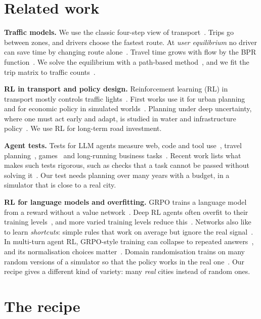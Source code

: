 \documentclass{article}
\begin{document}
\section{Related work}\label{sec:related}

\textbf{Traffic models.} We use the classic four-step view of transport~\cite{ortuzar2011}. Trips go between zones, and drivers choose the fastest route. At \emph{user equilibrium} no driver can save time by changing route alone~\cite{wardrop1952,beckmann1956,sheffi1985}. Travel time grows with flow by the BPR function~\cite{bpr1964}. We solve the equilibrium with a path-based method~\cite{jayakrishnan1994}, and we fit the trip matrix to traffic counts~\cite{vanzuylen1980}.

\textbf{RL in transport and policy design.} Reinforcement learning (RL) in transport mostly controls traffic lights~\cite{wei2018,wei2021}. First works use it for urban planning~\cite{zheng2023} and for economic policy in simulated worlds~\cite{zheng2022}. Planning under deep uncertainty, where one must act early and adapt, is studied in water and infrastructure policy~\cite{haasnoot2013}. We use RL for long-term road investment.

\textbf{Agent tests.} Tests for LLM agents measure web, code and tool use~\cite{liu2024,zhou2024,jimenez2024,yao2025,merrill2026}, travel planning~\cite{xie2024}, games~\cite{paglieri2025} and long-running business tasks~\cite{backlund2025}. Recent work lists what makes such tests rigorous, such as checks that a task cannot be passed without solving it~\cite{zhu2025}. Our test needs planning over many years with a budget, in a simulator that is close to a real city.

\textbf{RL for language models and overfitting.} GRPO trains a language model from a reward without a value network~\cite{shao2024,guo2025}. Deep RL agents often overfit to their training levels~\cite{zhang2018,cobbe2019,kirk2023}, and more varied training levels reduce this~\cite{cobbe2019,cobbe2020}. Networks also like to learn \emph{shortcuts}: simple rules that work on average but ignore the real signal~\cite{geirhos2020}. In multi-turn agent RL, GRPO-style training can collapse to repeated answers~\cite{wang2025ragen}, and its normalisation choices matter~\cite{liu2025}. Domain randomisation trains on many random versions of a simulator so that the policy works in the real one~\cite{tobin2017}. Our recipe gives a different kind of variety: many \emph{real} cities instead of random ones.

\section{The recipe}\label{sec:recipe}
\end{document}
